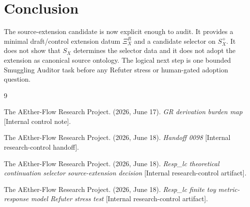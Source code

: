 \documentclass[11pt]{article}
\newcommand{\XiR}{\Xi_X^R}
\newcommand{\SX}{S_X}
\newcommand{\Splus}{S_X^+}
\begin{document}
\section{Conclusion}

The source-extension candidate is now explicit enough to audit. It
provides a minimal draft/control extension datum \(\XiR\) and a
candidate selector on \(\Splus\). It does not show that \(\SX\)
determines the selector data and it does not adopt the extension as
canonical source ontology. The logical next step is one bounded
Smuggling Auditor task before any Refuter stress or human-gated
adoption question.

\begin{thebibliography}{9}

The AEther-Flow Research Project. (2026, June 17). \emph{GR derivation
burden map} [Internal control note].

The AEther-Flow Research Project. (2026, June 18). \emph{Handoff 0098}
[Internal research-control handoff].

The AEther-Flow Research Project. (2026, June 18). \emph{Resp\_lc
theoretical continuation selector source-extension decision} [Internal
research-control artifact].

The AEther-Flow Research Project. (2026, June 18). \emph{Resp\_lc
finite toy metric-response model Refuter stress test} [Internal
research-control artifact].

\end{thebibliography}
\end{document}
